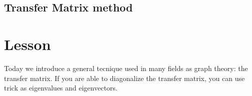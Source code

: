 \documentclass[../main/main.tex]{subfiles}
\begin{document}

\subsection{Transfer Matrix method}






\section{Lesson}

Today we introduce a general tecnique used in many fields as graph theory: the transfer matrix. If you are able to diagonalize the transfer matrix, you can use trick as eigenvalues and eigenvectors.
\end{document}
